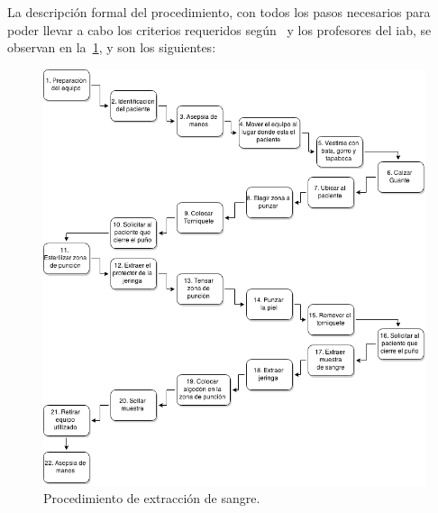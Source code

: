 


La descripción formal del procedimiento, con todos los pasos necesarios
para poder llevar a cabo los criterios requeridos según~\cite{oms:extraccion}
y los profesores del \Gls{iab}, se observan en la~\ref{fig:proc_hemocultivo}, y
son los siguientes:

\begin{figure}
\centering
\includegraphics[scale=0.5]{requerimientos/images/hemocultivo.png}
\caption{Procedimiento de extracción de sangre.}
\label{fig:proc_hemocultivo}
\end{figure}

